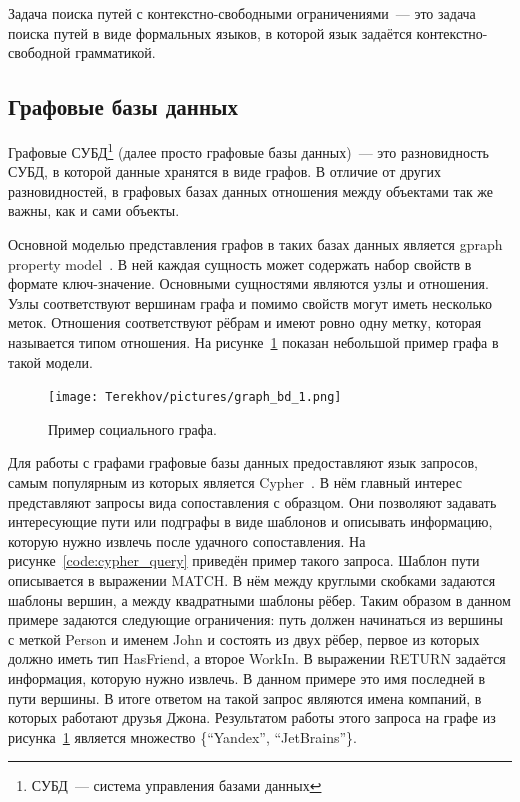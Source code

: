 Задача поиска путей с контекстно-свободными ограничениями~--- это задача поиска путей в виде формальных языков, в которой язык задаётся контекстно-свободной грамматикой.

\subsection{Графовые базы данных}
Графовые СУБД\footnote{СУБД~--- система управления базами данных} (далее просто графовые базы данных)~--- это разновидность СУБД, в которой данные хранятся в виде графов. В отличие от других разновидностей, в графовых базах данных отношения между объектами так же важны, как и сами объекты.

Основной моделью представления графов в таких базах данных является gpraph property model~\cite{graph-propery-model}. В ней каждая сущность может содержать набор свойств в формате ключ-значение. Основными сущностями являются узлы и отношения. Узлы соответствуют вершинам графа и помимо свойств могут иметь несколько меток. Отношения соответствуют рёбрам и имеют ровно одну метку, которая называется типом отношения. На рисунке~\ref{fig:graph_bd_1} показан небольшой пример графа в такой модели. 

\begin{figure}[h]
\centering
    \texttt{[image: Terekhov/pictures/graph\_bd\_1.png]}
    \caption{Пример социального графа.}
    \label{fig:graph_bd_1}
\end{figure}

Для работы с графами графовые базы данных предоставляют язык запросов, самым популярным из которых является Cypher~\cite{cypher-language}. В нём главный интерес представляют запросы вида сопоставления с образцом. Они позволяют задавать интересующие пути или подграфы в виде шаблонов и описывать информацию, которую нужно извлечь после удачного сопоставления. На рисунке~\ref{code:cypher_query} приведён пример такого запроса. Шаблон пути описывается в выражении MATCH. В нём между круглыми скобками задаются шаблоны вершин, а между квадратными шаблоны рёбер. Таким образом в данном примере задаются следующие ограничения: путь должен начинаться из вершины с меткой Person и именем John и состоять из двух рёбер, первое из которых должно иметь тип HasFriend, а второе WorkIn. В выражении RETURN задаётся информация, которую нужно извлечь. В данном примере это имя последней в пути вершины. В итоге ответом на такой запрос являются имена компаний, в которых работают друзья Джона. Результатом работы этого запроса на графе из рисунка~\ref{fig:graph_bd_1} является множество \{``Yandex'', ``JetBrains''\}.

